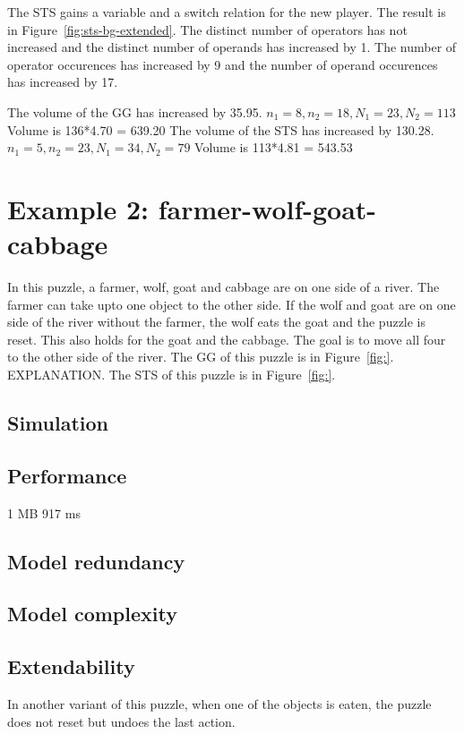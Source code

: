 The STS gains a variable and a switch relation for the new player. The result is in Figure~\ref{fig:sts-bg-extended}. The distinct number of operators has not increased and the distinct number of operands has increased by 1. The number of operator occurences has increased by 9 and the number of operand occurences has increased by 17.

The volume of the GG has increased by 35.95. $n_1 = 8, n_2 = 18, N_1 = 23, N_2 = 113$ Volume is 136*4.70 = 639.20
The volume of the STS has increased by 130.28. $n_1 = 5, n_2 = 23, N_1 = 34, N_2 = 79$ Volume is 113*4.81 = 543.53


\section{Example 2: farmer-wolf-goat-cabbage}
In this puzzle, a farmer, wolf, goat and cabbage are on one side of a river. The farmer can take upto one object to the other side. If the wolf and goat are on one side of the river without the farmer, the wolf eats the goat and the puzzle is reset. This also holds for the goat and the cabbage. The goal is to move all four to the other side of the river. The GG of this puzzle is in Figure~\ref{fig:}. EXPLANATION. The STS of this puzzle is in Figure~\ref{fig:}.

\subsection{Simulation}


\subsection{Performance}
1 MB 917 ms

\subsection{Model redundancy}


\subsection{Model complexity}


\subsection{Extendability}
In another variant of this puzzle, when one of the objects is eaten, the puzzle does not reset but undoes the last action. 


